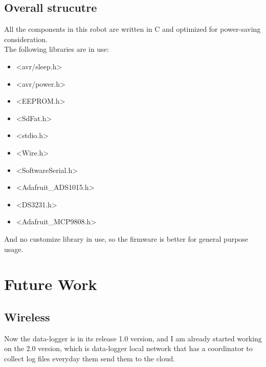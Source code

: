     \subsection{Overall strucutre}
    All the components in this robot are written in C and optimized for power-saving consideration.   \\
    The following libraries are in use: \\
    \begin{itemize}
        \item <avr/sleep.h>
        \item <avr/power.h>
        \item <EEPROM.h>
        \item <SdFat.h>
        \item <stdio.h>
        \item <Wire.h>
        \item <SoftwareSerial.h>
        \item <Adafruit\_ADS1015.h>
        \item <DS3231.h>
        \item <Adafruit\_MCP9808.h>
    \end{itemize}
       And no customize library in use, so the firmware is better for general purpose usage.

\section{Future Work}
\subsection{Wireless}
Now the data-logger is in its release 1.0 version, and I am already started working on the 2.0 version, which is data-logger local network that has a coordinator to collect log files everyday them send them to the cloud.



